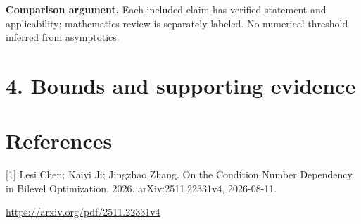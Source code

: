 \documentclass[10pt,a4paper]{article}
\begin{document}
\textbf{Comparison argument.} Each included claim has verified statement and applicability; mathematics review is separately labeled. No numerical threshold inferred from asymptotics.

\section{4. Bounds and supporting evidence}
\section{References}
[1] Lesi Chen; Kaiyi Ji; Jingzhao Zhang. On the Condition Number Dependency in Bilevel Optimization. 2026. arXiv:2511.22331v4, 2026-08-11.

\url{https://arxiv.org/pdf/2511.22331v4}
\end{document}
